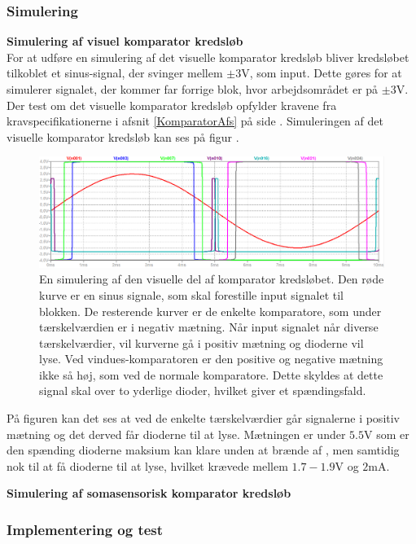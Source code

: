 \subsubsection{Simulering}
\noindent\textbf{Simulering af visuel komparator kredsløb} \\
For at udføre en simulering af det visuelle komparator kredsløb bliver kredsløbet tilkoblet et sinus-signal, der svinger mellem $\pm3$V, som input. Dette gøres for at simulerer signalet, der kommer far forrige blok, hvor arbejdsområdet er på $\pm3$V. Der test om det visuelle komparator kredsløb opfylder kravene fra kravspecifikationerne i afsnit \ref{KomparatorAfs} på side \pageref{KomparatorAfs}. Simuleringen af det visuelle komparator kredsløb kan ses på figur .
\begin{figure}[H]
	\centering
	\includegraphics[scale=1.0]{figures/cProblemloesning/komparator_visuel_simulering_samlet.PNG}
	\caption{En simulering af den visuelle del af komparator kredsløbet. Den røde kurve er en sinus signale, som skal forestille input signalet til blokken. De resterende kurver er de enkelte komparatore, som under tærskelværdien er i negativ mætning. Når input signalet når diverse tærskelværdier, vil kurverne gå i positiv mætning og dioderne vil lyse. Ved vindues-komparatoren er den positive og negative mætning ikke så høj, som ved de normale komparatore. Dette skyldes at dette signal skal over to yderlige dioder, hvilket giver et spændingsfald. }
	\label{fig:komparator_visuel_simulering_samlet}
\end{figure}
På figuren  kan det ses at ved de enkelte tærskelværdier går signalerne i positiv mætning og det derved får dioderne til at lyse. Mætningen er under $5.5$V som er den spænding dioderne maksium kan klare unden at brænde af , men samtidig nok til at få dioderne til at lyse, hvilket krævede mellem $1.7-1.9$V og $2$mA. 

\noindent\textbf{Simulering af somasensorisk komparator kredsløb} \\

\subsubsection{Implementering og test}
